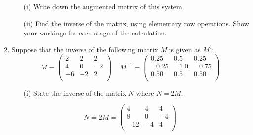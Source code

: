 \documentclass[a4paper,12pt]{article}
\begin{document}
\begin{enumerate}
\begin{itemize}
\item[(i)]  Write down the augmented matrix of this system. %


\item[(ii)]  Find the inverse of the matrix, using elementary row operations. Show your workings for each stage of the calculation.
\end{itemize}

\item 
Suppose that the inverse of the following matrix $M$ is given as $M^{1}$: 
\[M = \left(\begin{array}{rrr}
2    & 2  &  2 \\
4    & 0 &  -2\\
-6   & -2 &   2\\
\end{array}\right)\;\;\;\;M^{-1} = \left(\begin{array}{rrr}
0.25 & 0.5  & 0.25\\
-0.25 & -1.0& -0.75\\
 0.50 & 0.5 & 0.50\\
\end{array}\right)\]

\begin{itemize}
\item[(i)]  State the inverse of the matrix $N$ where $N = 2M$.
\end{itemize}
\[
N = 2M = \left(\begin{array}{rrr}
4 &   4  &  4 \\
8 &   0  & -4\\
-12 &  -4  &  4\\
\end{array}\right)
\]




\end{enumerate}
\end{document}
